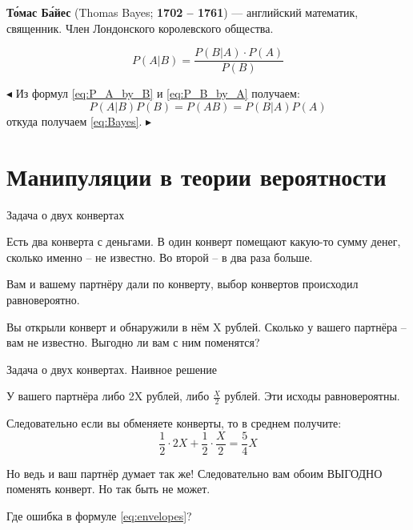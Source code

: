 \begin{frame}
\textbf{То́мас Ба́йес}
(Thomas Bayes; \textbf{1702 -- 1761}) 
— английский математик, священник. 
Член Лондонского королевского общества.
	
\begin{equation}\label{eq:Bayes}
P(A|B) = \frac{P(B|A) \cdot P(A)}{P(B)}
\end{equation}

$\blacktriangleleft$
Из формул \eqref{eq:P_A_by_B} и \eqref{eq:P_B_by_A}
получаем:
\begin{equation*}
P(A|B)P(B) = P(AB) = P(B|A) P(A)
\end{equation*}
откуда получаем \eqref{eq:Bayes}.
$\blacktriangleright$


\end{frame}





\section{Манипуляции в теории вероятности}\label{section:manipulations}
\begin{frame}{Задача о двух конвертах}

Есть два конверта с деньгами.
В один конверт помещают какую-то сумму денег,
сколько именно -- не известно. 
Во второй -- в два раза больше.

Вам и вашему партнёру дали по конверту, 
выбор конвертов происходил равновероятно.

Вы открыли конверт и обнаружили в нём X рублей.
Сколько у вашего партнёра -- вам не известно.
Выгодно ли вам с ним поменятся?


\end{frame}

\begin{frame}{Задача о двух конвертах. Наивное решение}

У вашего партнёра либо 2X рублей, либо
$\frac{X}{2}$ рублей. Эти исходы равновероятны.

Следовательно если вы обменяете конверты, то в среднем получите:
\begin{equation}\label{eq:envelopes}
	\frac{1}{2}\cdot2X + \frac{1}{2}\cdot\frac{X}{2}=\frac{5}{4}X	
\end{equation}

Но ведь и ваш партнёр думает так же! 
Следовательно вам обоим ВЫГОДНО поменять конверт.
Но так быть не может.

Где ошибка в формуле \eqref{eq:envelopes}?
\end{frame}

